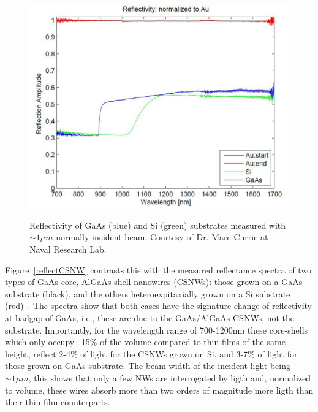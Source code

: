 \begin{figure}
  \caption{Reflectivity of GaAs (blue) and Si (green) substrates measured with $\sim{1}{\mu}m$ normally incident beam. Courtesy of Dr. Marc Currie at Naval Research Lab.}
  \centering
  \includegraphics[width=\textwidth]{pictures/Data/reflecbulk}
  \label{reflecbulk}
\end{figure}

Figure~\ref{reflectCSNW} contrasts this with the measured reflectance spectra
of two types of GaAs core, AlGaAs shell nanowires (CSNWs): those grown on a
GaAs substrate (black), and the others heteroexpitaxially grown on a Si
substrate (red)~\cite{Wang:2013ux}. The spectra show that both cases have the
signature change of reflectivity at badgap of GaAs, i.e., these are due to the
GaAs/AlGaAs CSNWs, not the substrate. Importantly, for the wavelength range of
700-1200nm these core-shells which only occupy ~15\% of the volume compared to
thin films of the same height, reflect 2-4\% of light for the CSNWs grown on
Si, and 3-7\% of light for those grown on GaAs substrate. The beam-width of the
incident light being $\sim1{\mu}m$, this shows that only a few NWs are
interrogated by ligth and, normalized to volume, these wires absorb more than
two orders of magnitude more ligth than their thin-film counterparts.

